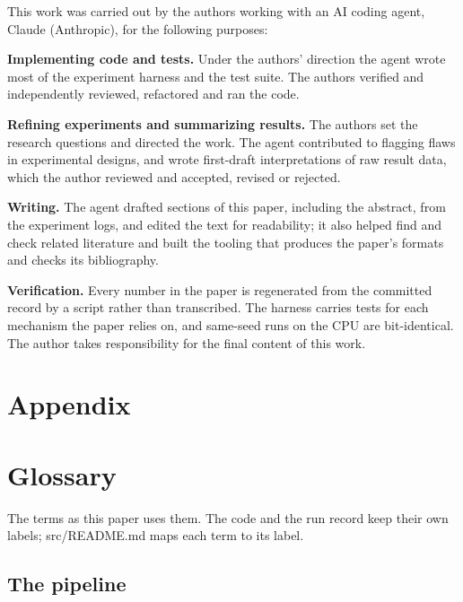 \documentclass[10pt]{article}
\makeatletter
\newcommand{\tmlr@floatbarrier}{\par\vspace{\z@}%
  \ifx\@deferlist\@empty\else\clearpage\fi}
\let\tmlr@section\section
\renewcommand{\section}{\tmlr@floatbarrier\tmlr@section}
\makeatother
\begin{document}
This work was carried out by the authors working with an AI coding
agent, Claude (Anthropic), for the following purposes:

\textbf{Implementing code and tests.} Under the authors' direction the
agent wrote most of the experiment harness and the test suite. The
authors verified and independently reviewed, refactored and ran the
code.

\textbf{Refining experiments and summarizing results.} The authors set
the research questions and directed the work. The agent contributed to
flagging flaws in experimental designs, and wrote first-draft
interpretations of raw result data, which the author reviewed and
accepted, revised or rejected.

\textbf{Writing.} The agent drafted sections of this paper, including
the abstract, from the experiment logs, and edited the text for
readability; it also helped find and check related literature and built
the tooling that produces the paper's formats and checks its
bibliography.

\textbf{Verification.} Every number in the paper is regenerated from the
committed record by a script rather than transcribed. The harness
carries tests for each mechanism the paper relies on, and same-seed runs
on the CPU are bit-identical. The author takes responsibility for the
final content of this work.


\appendix
\section*{Appendix}\label{appendix}

\section{Glossary}\label{glossary}

The terms as this paper uses them. The code and the run record keep
their own labels; src/README.md maps each term to its label.

\subsection{The pipeline}\label{the-pipeline}
\end{document}
